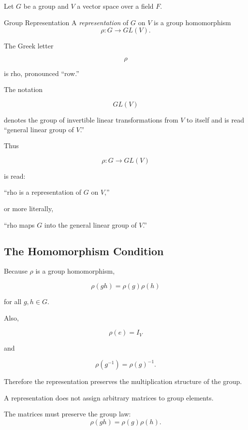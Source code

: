 Let \(G\) be a group and \(V\) a vector space over a field \(F\).

\begin{definitionbox}{Group Representation}
A \emph{representation} of \(G\) on \(V\) is a group homomorphism
\[ \rho:G\to GL(V). \]
\end{definitionbox}

The Greek letter

\[ \rho \]

is rho, pronounced ``row.''

The notation

\[ GL(V) \]

denotes the group of invertible linear transformations from \(V\) to itself
and is read ``general linear group of \(V\).''

Thus

\[ \rho:G\to GL(V) \]

is read:

``rho is a representation of \(G\) on \(V\),''

or more literally,

``rho maps \(G\) into the general linear group of \(V\).''

\subsection{The Homomorphism Condition}
\label{subsec:representation-homomorphism-condition}

Because \(\rho\) is a group homomorphism,

\[ \rho(gh)=\rho(g)\rho(h) \]

for all \(g,h\in G\).

Also,

\[ \rho(e)=I_V \]

and

\[ \rho(g^{-1})=\rho(g)^{-1}. \]

Therefore the representation preserves the multiplication structure of the
group.

\begin{importantbox}
A representation does not assign arbitrary matrices to group elements.

The matrices must preserve the group law:
\[ \rho(gh)=\rho(g)\rho(h). \]
\end{importantbox}

